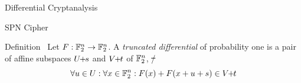 \begin{frame}{Differential Cryptanalysis}
\begin{block}{SPN Cipher}
        \vspace{0.5em}
    \end{block}
    \begin{block}{Definition~\cite{FSE:Knudsen94,FSE:BloLeaNyb14}}
        Let $F : \mathbb{F}_2^n \to \mathbb{F}_2^n$.
        A \emph{truncated differential} of probability one is a pair of affine subspaces $U \!\! + \!\! s$ and $V \!\! + \!\! t$ of $\mathbb{F}_2^n$, \st/
        \begin{equation*}
            \forall u \in U : \forall x \in \mathbb{F}_2^n : F(x) + F(x + u + s) \in V \!\! + \!\! t
        \end{equation*}
    \end{block}
\end{frame}

